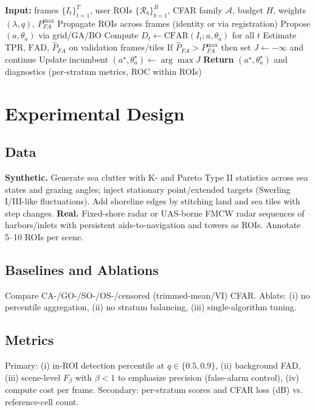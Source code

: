 \documentclass[10pt,letterpaper]{article}
\begin{document}
\begin{algorithm}[t]
\caption{User-in-the-Loop CFAR Tuning (High Level)}
\label{alg:cfar}
\begin{algorithmic}[1]
\STATE \textbf{Input:} frames $\{I_t\}_{t=1}^T$, user ROIs $\{\mathcal{R}_b\}_{b=1}^B$, CFAR family $\mathcal{A}$, budget $H$, weights $(\lambda, q)$, $P_{FA}^{\max}$
\STATE Propagate ROIs across frames (identity or via registration)
    \STATE Propose $(a,\theta_a)$ via grid/GA/BO
    \STATE Compute $D_t\leftarrow \mathrm{CFAR}(I_t; a,\theta_a)$ for all $t$
    \STATE Estimate $\mathrm{TPR}$, $\mathrm{FAD}$, $\widehat{P}_{FA}$ on validation frames/tiles
    \STATE If $\widehat{P}_{FA}>P_{FA}^{\max}$ then set $J\leftarrow -\infty$ and continue
    \STATE Update incumbent $(a^\star,\theta_a^\star)\leftarrow \arg\max J$
\ENDFOR
\STATE \textbf{Return} $(a^\star,\theta_a^\star)$ and diagnostics (per-stratum metrics, ROC within ROIs)
\end{algorithmic}
\end{algorithm}

\section{Experimental Design}
\subsection{Data}
\textbf{Synthetic.} Generate sea clutter with K- and Pareto Type II statistics across sea states and grazing angles; inject stationary point/extended targets (Swerling I/III-like fluctuations). Add shoreline edges by stitching land and sea tiles with step changes.\newline
\textbf{Real.} Fixed-shore radar or UAS-borne FMCW radar sequences of harbors/inlets with persistent aids-to-navigation and towers as ROIs. Annotate 5--10 ROIs per scene.

\subsection{Baselines and Ablations}
Compare CA-/GO-/SO-/OS-/censored (trimmed-mean/VI) CFAR. Ablate: (i) no percentile aggregation, (ii) no stratum balancing, (iii) single-algorithm tuning.

\subsection{Metrics}
Primary: (i) in-ROI detection percentile at $q\in\{0.5,0.9\}$, (ii) background FAD, (iii) scene-level $F_\beta$ with $\beta<1$ to emphasize precision (false-alarm control), (iv) compute cost per frame. Secondary: per-stratum scores and CFAR loss (dB) vs. reference-cell count.
\end{document}
